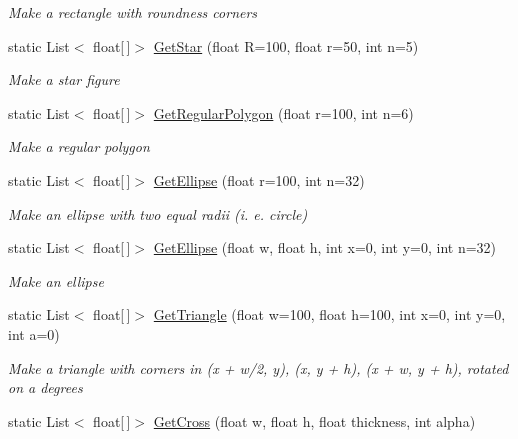 \begin{DoxyCompactItemize}
\begin{DoxyCompactList}\small\item\em Make a rectangle with roundness corners \end{DoxyCompactList}\item 
static List$<$ float\mbox{[}$\,$\mbox{]}$>$ \mbox{\hyperlink{class_space_v_i_l_1_1_graphics_math_service_ac13dd440895e5418e4dfcfe42af9aaf2}{Get\+Star}} (float R=100, float r=50, int n=5)
\begin{DoxyCompactList}\small\item\em Make a star figure \end{DoxyCompactList}\item 
static List$<$ float\mbox{[}$\,$\mbox{]}$>$ \mbox{\hyperlink{class_space_v_i_l_1_1_graphics_math_service_a9674c1169184a3f66798b1f5324e252f}{Get\+Regular\+Polygon}} (float r=100, int n=6)
\begin{DoxyCompactList}\small\item\em Make a regular polygon \end{DoxyCompactList}\item 
static List$<$ float\mbox{[}$\,$\mbox{]}$>$ \mbox{\hyperlink{class_space_v_i_l_1_1_graphics_math_service_a94c931fa779520422e3a210b4ddcb654}{Get\+Ellipse}} (float r=100, int n=32)
\begin{DoxyCompactList}\small\item\em Make an ellipse with two equal radii (i. e. circle) \end{DoxyCompactList}\item 
static List$<$ float\mbox{[}$\,$\mbox{]}$>$ \mbox{\hyperlink{class_space_v_i_l_1_1_graphics_math_service_ad83589eaf4bc7f7ab65a2512eb0c100c}{Get\+Ellipse}} (float w, float h, int x=0, int y=0, int n=32)
\begin{DoxyCompactList}\small\item\em Make an ellipse \end{DoxyCompactList}\item 
static List$<$ float\mbox{[}$\,$\mbox{]}$>$ \mbox{\hyperlink{class_space_v_i_l_1_1_graphics_math_service_a7b388cc000e735002d5a5333375af1bb}{Get\+Triangle}} (float w=100, float h=100, int x=0, int y=0, int a=0)
\begin{DoxyCompactList}\small\item\em Make a triangle with corners in (x + w/2, y), (x, y + h), (x + w, y + h), rotated on a degrees \end{DoxyCompactList}\item 
static List$<$ float\mbox{[}$\,$\mbox{]}$>$ \mbox{\hyperlink{class_space_v_i_l_1_1_graphics_math_service_a8424734d317d63674607d33709a85a9c}{Get\+Cross}} (float w, float h, float thickness, int alpha)

\end{DoxyCompactItemize}
